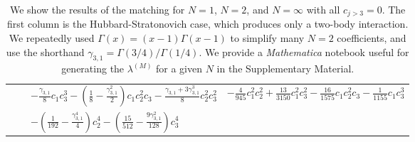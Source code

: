 \documentclass[aps,prl,twocolumn,showpacs,superscriptaddress,groupedaddress, final, nofootinbib]{revtex4}  %
\newcommand{\g}{\ensuremath{\gamma}}
\newcommand{\oneby}[1]{\frac{1}{#1}}
\begin{document}
\begin{table}
\begin{center}
{\begin{tabular}{|c|c|p{}|p{}|}
                        \\
                        &                       &   $- \frac{\g_{3,1}}{8}c_1c_3^3 - \left(\oneby{8}-\frac{\g_{3,1}^2}{2}\right)c_1c_2^2c_3 - \frac{\g_{3,1}+3\g_{3,1}^3}{8}c_2^2c_3^2$
                                    &   $- \frac{4}{945}c_1^2c_2^2 + \frac{13}{3150} c_1^2 c_3^2 - \frac{16}{1575} c_1c_2^2c_3 - \oneby{1155} c_1c_3^3$
                        \\
                        &                       &   $ - \left(\oneby{192}-\frac{\g_{3,1}^4}{4}\right) c_2^4 - \left(\frac{15}{512} - \frac{9\g_{3,1}^2}{128}\right)c_3^4$
                                    &
                        \\
        \hline
    \end{tabular}
}
    \end{center}
    \caption{ We show the results of the matching for $N=1$, $N=2$, and $N=\infty$ with all $c_{j>3}=0$.  The first column is the Hubbard-Stratonovich case, which produces only a two-body interaction.  We repeatedly used $\Gamma(x)=(x-1)\Gamma(x-1)$ to simplify many $N=2$ coefficients, and use the shorthand $\g_{3,1}=\Gamma(3/4)/\Gamma(1/4)$.  We provide a {\it Mathematica} notebook useful for generating the $\lambda^{(M)}$ for a given $N$ in the Supplementary Material.}
    \label{tab:coeff}
\end{table}
\end{document}
